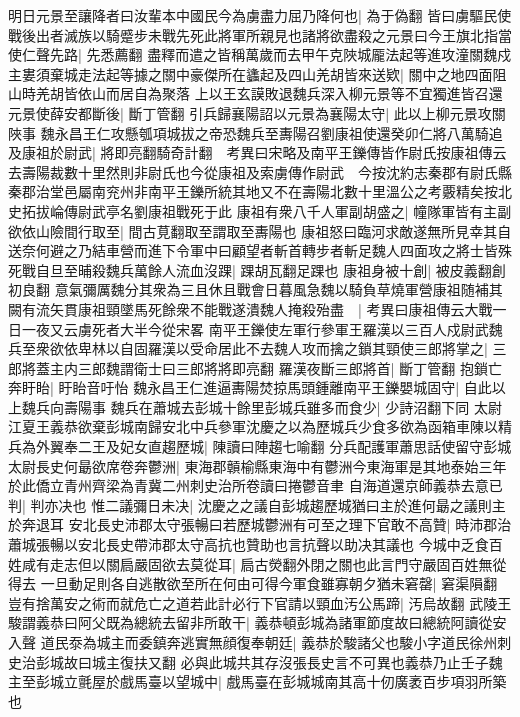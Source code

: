 明日元景至讓降者曰汝輩本中國民今為虜盡力屈乃降何也|{
	為于偽翻}
皆曰虜驅民使戰後出者滅族以騎蹙步未戰先死此將軍所親見也諸將欲盡殺之元景曰今王旗北指當使仁聲先路|{
	先悉薦翻}
盡釋而遣之皆稱萬歲而去甲午克陜城龎法起等進攻潼關魏戍主婁須棄城走法起等據之關中豪傑所在蠭起及四山羌胡皆來送欵|{
	關中之地四面阻山時羌胡皆依山而居自為聚落}
上以王玄謨敗退魏兵深入柳元景等不宜獨進皆召還元景使薛安都斷後|{
	斷丁管翻}
引兵歸襄陽詔以元景為襄陽太守|{
	此以上柳元景攻關陜事}
魏永昌王仁攻懸瓠項城拔之帝恐魏兵至夀陽召劉康祖使還癸卯仁將八萬騎追及康祖於尉武|{
	將即亮翻騎奇計翻　考異曰宋略及南平王鑠傳皆作尉氏按康祖傳云去壽陽裁數十里然則非尉氏也今從康祖及索虜傳作尉武　今按沈約志秦郡有尉氏縣秦郡治堂邑屬南兖州非南平王鑠所統其地又不在壽陽北數十里溫公之考覈精矣按北史拓拔崘傳尉武亭名劉康祖戰死于此}
康祖有衆八千人軍副胡盛之|{
	幢隊軍皆有主副}
欲依山險間行取至|{
	間古莧翻取至謂取至夀陽也}
康祖怒曰臨河求敵遂無所見幸其自送奈何避之乃結車營而進下令軍中曰顧望者斬首轉步者斬足魏人四面攻之將士皆殊死戰自旦至晡殺魏兵萬餘人流血沒踝|{
	踝胡瓦翻足踝也}
康祖身被十創|{
	被皮義翻創初良翻}
意氣彌厲魏分其衆為三且休且戰會日暮風急魏以騎負草燒軍營康祖随補其闕有流矢貫康祖頸墜馬死餘衆不能戰遂潰魏人掩殺殆盡　|{
	考異曰康祖傳云大戰一日一夜又云虜死者大半今從宋畧}
南平王鑠使左軍行參軍王羅漢以三百人戍尉武魏兵至衆欲依卑林以自固羅漢以受命居此不去魏人攻而擒之鎖其頸使三郎將掌之|{
	三郎將蓋主内三郎魏謂衛士曰三郎將將即亮翻}
羅漢夜斷三郎將首|{
	斷丁管翻}
抱鎖亡奔盱眙|{
	盱眙音吁怡}
魏永昌王仁進逼夀陽焚掠馬頭鍾離南平王鑠嬰城固守|{
	自此以上魏兵向壽陽事}
魏兵在蕭城去彭城十餘里彭城兵雖多而食少|{
	少詩沼翻下同}
太尉江夏王義恭欲棄彭城南歸安北中兵參軍沈慶之以為歷城兵少食多欲為函箱車陳以精兵為外翼奉二王及妃女直趨歷城|{
	陳讀曰陣趨七喻翻}
分兵配護軍蕭思話使留守彭城太尉長史何朂欲席卷奔鬱洲|{
	東海郡贑榆縣東海中有鬱洲今東海軍是其地泰始三年於此僑立青州齊梁為青冀二州刺史治所卷讀曰捲鬱音聿}
自海道還京師義恭去意已判|{
	判亦决也}
惟二議彌日未决|{
	沈慶之之議自彭城趨歷城猶曰主於進何朂之議則主於奔退耳}
安北長史沛郡太守張暢曰若歷城鬱洲有可至之理下官敢不高贊|{
	時沛郡治蕭城張暢以安北長史帶沛郡太守高抗也贊助也言抗聲以助决其議也}
今城中乏食百姓咸有走志但以關扃嚴固欲去莫從耳|{
	扃古熒翻外閉之關也此言門守嚴固百姓無從得去}
一旦動足則各自逃散欲至所在何由可得今軍食雖寡朝夕猶未窘罄|{
	窘渠隕翻}
豈有捨萬安之術而就危亡之道若此計必行下官請以頸血汚公馬蹄|{
	汚烏故翻}
武陵王駿謂義恭曰阿父既為總統去留非所敢干|{
	義恭頓彭城為諸軍節度故曰總統阿讀從安入聲}
道民沗為城主而委鎮奔逃實無顔復奉朝廷|{
	義恭於駿諸父也駿小字道民徐州刺史治彭城故曰城主復扶又翻}
必與此城共其存沒張長史言不可異也義恭乃止壬子魏主至彭城立氈屋於戲馬臺以望城中|{
	戲馬臺在彭城城南其高十仞廣袤百步項羽所築也}

